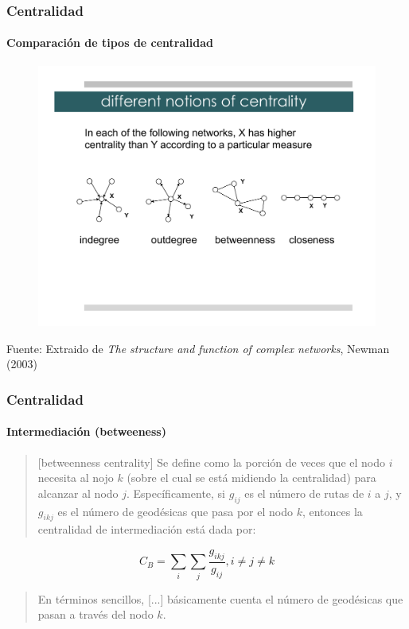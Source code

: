\documentclass[10pt]{beamer}
\begin{document}
\begin{frame}
\frametitle{Centralidad}
\framesubtitle{Comparaci\'on de tipos de centralidad}
\begin{figure}
\includegraphics[trim=2cm 6cm 2cm 4cm, clip=true, width=\linewidth]{Lecture3Acentrality_comparison.pdf}
\end{figure}
{\footnotesize Fuente: Extraido de \emph{The structure and function of complex networks}, Newman (2003) \cite{newman2003structure}}
\end{frame}

\begin{frame}
\frametitle{Centralidad}
\framesubtitle{Intermediaci\'on (betweeness)}

\begin{quote}
[betweenness centrality] Se define como la porci\'on de veces que el nodo $i$ necesita al nojo $k$ (sobre
el cual se est\'a midiendo la centralidad) para alcanzar al nodo $j$.
Espec\'ificamente, si $g_{ij}$ es el n\'umero de rutas de $i$ a $j$, y $g_{ikj}$
es el n\'umero de geod\'esicas que pasa por el nodo $k$, entonces la centralidad
de intermediaci\'on est\'a dada por: 
\end{quote}

\begin{equation}
C_B=\sum_i\sum_j{\frac{g_{ikj}}{g_{ij}}}, i \neq j \neq k
\end{equation}

\begin{quote}
En t\'erminos sencillos, [...] b\'asicamente cuenta el n\'umero de geod\'esicas
que pasan a trav\'es del nodo $k$. \cite{borgatti2005centrality}
\end{quote}
\end{frame}
\end{document}
